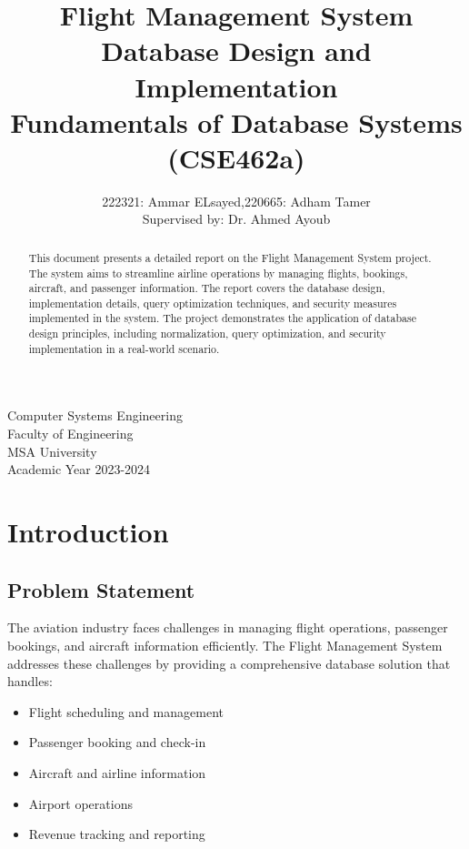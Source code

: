 \documentclass[a4paper,12pt]{article}
\title{\Huge Flight Management System\\[0.5cm]
\Large Database Design and Implementation\\[1cm]
\large Fundamentals of Database Systems (CSE462a)}
\author{222321: Ammar ELsayed,220665: Adham Tamer \\[0.3cm]
Supervised by: Dr. Ahmed Ayoub}
\begin{document}
\begin{titlepage}
    \maketitle
    \thispagestyle{empty}
    \begin{center}
        \vspace*{2cm}
        \vspace*{8cm}
        
        \large Computer Systems Engineering\\
        Faculty of Engineering\\
        MSA University\\
        \vspace*{1cm}
        Academic Year 2023-2024
    \end{center}
\end{titlepage}

\tableofcontents
\newpage

\begin{abstract}
This document presents a detailed report on the Flight Management System project. The system aims to streamline airline operations by managing flights, bookings, aircraft, and passenger information. The report covers the database design, implementation details, query optimization techniques, and security measures implemented in the system. The project demonstrates the application of database design principles, including normalization, query optimization, and security implementation in a real-world scenario.
\end{abstract}

\section{Introduction}
\subsection{Problem Statement}
The aviation industry faces challenges in managing flight operations, passenger bookings, and aircraft information efficiently. The Flight Management System addresses these challenges by providing a comprehensive database solution that handles:
\begin{itemize}
    \item Flight scheduling and management
    \item Passenger booking and check-in
    \item Aircraft and airline information
    \item Airport operations
    \item Revenue tracking and reporting
\end{itemize}
\end{document}
